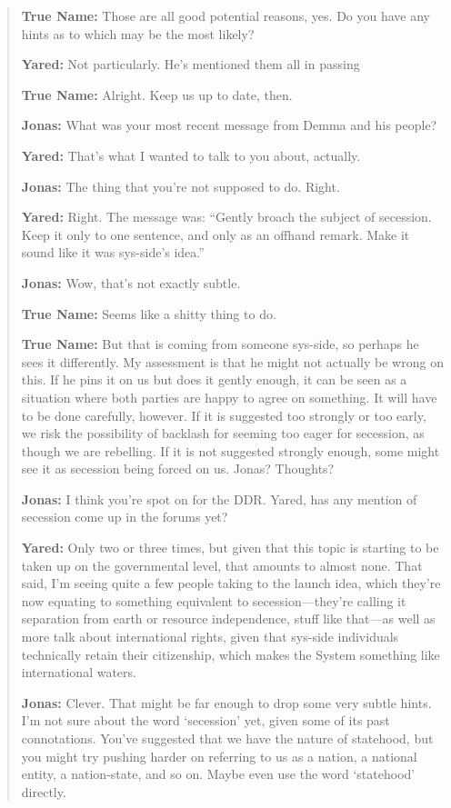 \begin{quote}
\textbf{True Name:} Those are all good potential reasons, yes. Do you have any hints as to which may be the most likely?

\textbf{Yared:} Not particularly. He's mentioned them all in passing

\textbf{True Name:} Alright. Keep us up to date, then.

\textbf{Jonas:} What was your most recent message from Demma and his people?

\textbf{Yared:} That's what I wanted to talk to you about, actually.

\textbf{Jonas:} The thing that you're not supposed to do. Right.

\textbf{Yared:} Right. The message was: ``Gently broach the subject of secession. Keep it only to one sentence, and only as an offhand remark. Make it sound like it was sys-side's idea.''

\textbf{Jonas:} Wow, that's not exactly subtle.

\textbf{True Name:} Seems like a shitty thing to do.

\textbf{True Name:} But that is coming from someone sys-side, so perhaps he sees it differently. My assessment is that he might not actually be wrong on this. If he pins it on us but does it gently enough, it can be seen as a situation where both parties are happy to agree on something. It will have to be done carefully, however. If it is suggested too strongly or too early, we risk the possibility of backlash for seeming too eager for secession, as though we are rebelling. If it is not suggested strongly enough, some might see it as secession being forced on us. Jonas? Thoughts?

\textbf{Jonas:} I think you're spot on for the DDR. Yared, has any mention of secession come up in the forums yet?

\textbf{Yared:} Only two or three times, but given that this topic is starting to be taken up on the governmental level, that amounts to almost none. That said, I'm seeing quite a few people taking to the launch idea, which they're now equating to something equivalent to secession---they're calling it separation from earth or resource independence, stuff like that---as well as more talk about international rights, given that sys-side individuals technically retain their citizenship, which makes the System something like international waters.

\textbf{Jonas:} Clever. That might be far enough to drop some very subtle hints. I'm not sure about the word `secession' yet, given some of its past connotations. You've suggested that we have the nature of statehood, but you might try pushing harder on referring to us as a nation, a national entity, a nation-state, and so on. Maybe even use the word `statehood' directly.


\end{quote}
